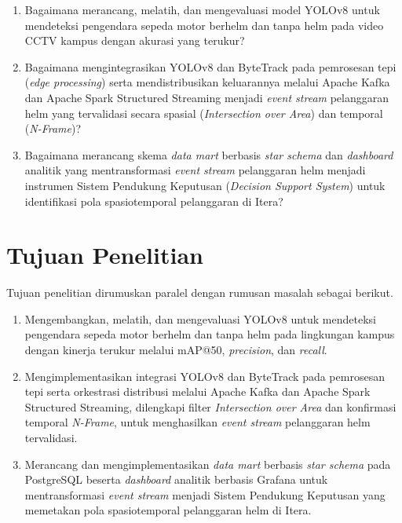 \begin{enumerate}
  \item Bagaimana merancang, melatih, dan mengevaluasi model YOLOv8 untuk mendeteksi pengendara sepeda motor berhelm dan tanpa helm pada video CCTV kampus dengan akurasi yang terukur?

  \item Bagaimana mengintegrasikan YOLOv8 dan ByteTrack pada pemrosesan tepi (\textit{edge processing}) serta mendistribusikan keluarannya melalui Apache Kafka dan Apache Spark Structured Streaming menjadi \textit{event stream} pelanggaran helm yang tervalidasi secara spasial (\textit{Intersection over Area}) dan temporal (\textit{N-Frame})?

  \item Bagaimana merancang skema \textit{data mart} berbasis \textit{star schema} dan \textit{dashboard} analitik yang mentransformasi \textit{event stream} pelanggaran helm menjadi instrumen Sistem Pendukung Keputusan (\textit{Decision Support System}) untuk identifikasi pola spasiotemporal pelanggaran di Itera?
\end{enumerate}

\section{Tujuan Penelitian}
\label{section:tujuanpenelitian}

Tujuan penelitian dirumuskan paralel dengan rumusan masalah sebagai berikut.

\begin{enumerate}
  \item Mengembangkan, melatih, dan mengevaluasi YOLOv8 untuk mendeteksi pengendara sepeda motor berhelm dan tanpa helm pada lingkungan kampus dengan kinerja terukur melalui mAP@50, \textit{precision}, dan \textit{recall}.

  \item Mengimplementasikan integrasi YOLOv8 dan ByteTrack pada pemrosesan tepi serta orkestrasi distribusi melalui Apache Kafka dan Apache Spark Structured Streaming, dilengkapi filter \textit{Intersection over Area} dan konfirmasi temporal \textit{N-Frame}, untuk menghasilkan \textit{event stream} pelanggaran helm tervalidasi.

  \item Merancang dan mengimplementasikan \textit{data mart} berbasis \textit{star schema} pada PostgreSQL beserta \textit{dashboard} analitik berbasis Grafana untuk mentransformasi \textit{event stream} menjadi Sistem Pendukung Keputusan yang memetakan pola spasiotemporal pelanggaran helm di Itera.
\end{enumerate}

